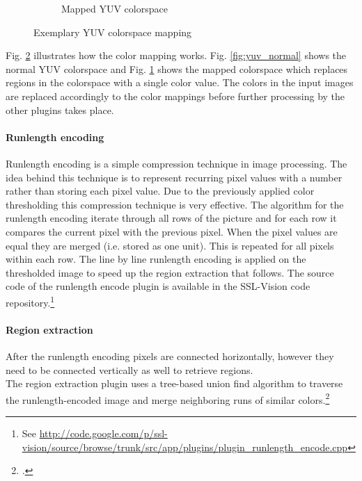 \begin{savenotes}
\begin{figure}
\begin{subfigure}[b]{0.3\textwidth}
                \caption{Mapped YUV colorspace}
                \label{fig:yuv_mapped}
        \end{subfigure}

        \caption{Exemplary YUV colorspace mapping}\label{fig:yuv}
\end{figure}
\end{savenotes}

Fig. \ref{fig:yuv} illustrates how the color mapping works. Fig.
\ref{fig:yuv_normal} shows the normal YUV colorspace and Fig.
\ref{fig:yuv_mapped} shows the mapped colorspace which replaces regions in the
colorspace with a single color value. The colors in the input images are
replaced accordingly to the color mappings before further processing by the other
plugins takes place.


\paragraph{Runlength encoding}

Runlength encoding is a simple compression technique in image processing. The
idea behind this technique is to represent recurring pixel values with a number
rather than storing each pixel value. Due to the previously applied color thresholding
this compression technique is very effective.
The algorithm for the runlength encoding iterate through all rows of the picture
and for each row it compares the current pixel with the previous pixel. When the pixel values are
equal they are merged (i.e. stored as one unit). This is repeated for all pixels within each row.
The line by line runlength encoding is applied on the thresholded image to speed up the
region extraction that follows.
The source code of the runlength encode plugin is available in the SSL-Vision code 
repository.\footnote{See \url{http://code.google.com/p/ssl-vision/source/browse/trunk/src/app/plugins/plugin_runlength_encode.cpp}}

\paragraph{Region extraction}
After the runlength encoding pixels are connected horizontally, however they
need to be connected vertically as well to retrieve regions.\\
The region extraction plugin uses a tree-based union find algorithm to traverse the
runlength-encoded image and merge neighboring runs of similar colors.\footcite[Cf.][p. 6 et sq.]{zickler_ssl_vision}

